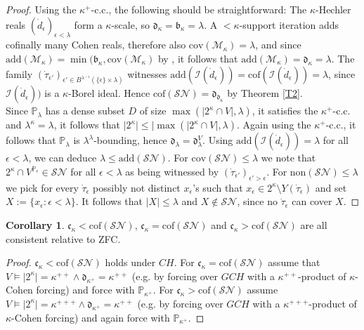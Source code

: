 \documentclass[12pt,a4paper]{scrartcl}
\theoremstyle{definition}
\newtheorem{corollary}[definition] {Corollary}
\numberwithin{equation}{section}
\begin{document}
\begin{proof}
Using the $\kappa^+$-c.c., the following should be straightforward: The $\kappa$-Hechler reals $(\dot{d}_\epsilon)_{\epsilon < \lambda}$ form a $\kappa$-scale, so $\mathfrak{d}_\kappa=\mathfrak{b}_\kappa=\lambda$. A ${<}\kappa$-support iteration adds cofinally many Cohen reals, therefore also $\text{cov}(\mathcal{M}_\kappa)=\lambda$, and since $\text{add}(\mathcal{M}_\kappa)= \min( \mathfrak{b}_\kappa, \text{cov}(\mathcal{M}_\kappa)$ by \cite{Baumhauer}, it follows that $\text{add}(\mathcal{M}_\kappa)=\mathfrak{d}_\kappa= \lambda$. The family $(\dot{\tau}_{\epsilon'})_{ \epsilon' \in B^{\lambda \, ^{-1}} (\{\epsilon\} \times \lambda)}$ witnesses $\text{add}(\mathcal{I}(\dot{d}_\epsilon))=\text{cof}(\mathcal{I}(\dot{d}_\epsilon)) =\lambda$, since $\mathcal{I}(\dot{d}_\epsilon))$ is a $\kappa$-Borel ideal. Hence $\text{cof}(\mathcal{SN})=\mathfrak{d}_{\mathfrak{d}_\kappa}$ by Theorem \ref{T2}.\\
Since $\mathbb{P}_\lambda$ has a dense subset $D$ of size $\max(\vert 2^\kappa \cap V \vert, \lambda)$, it satisfies the $\kappa^+$-c.c. and $\lambda^\kappa=\lambda$, it follows that $\vert 2^\kappa\vert \leq \vert\max(\vert 2^\kappa \cap V \vert, \lambda)$. Again using the $\kappa^+$-c.c., it follows that $\mathbb{P}_\lambda$ is $\lambda^\lambda$-bounding, hence $\mathfrak{d}_\lambda=\mathfrak{d}_\lambda^V$. Using $\text{add}(\mathcal{I}(\dot{d}_\epsilon))=\lambda$ for all $\epsilon< \lambda$, we can deduce $\lambda \leq \text{add}(\mathcal{SN})$. For $\text{cov}(\mathcal{SN}) \leq \lambda$ we note that $2^\kappa \cap V^{\mathbb{P}_\epsilon} \in \mathcal{SN}$ for all $\epsilon<\lambda$ as being witnessed by $(\dot{\tau}_{\epsilon'})_{\epsilon'> \epsilon}$. For $\text{non}(\mathcal{SN}) \leq \lambda$ we pick for every $\dot{\tau}_\epsilon$ possibly not distinct $x_\epsilon$'s such that $x_\epsilon \in 2^\kappa \setminus Y(\dot{\tau}_\epsilon)$ and set $X:=\{x_\epsilon \colon \epsilon< \lambda\}$. It follows that $\vert X \vert \leq \lambda$ and $X \notin \mathcal{SN}$, since no $\dot{\tau}_\epsilon$ can cover $X$.
\end{proof}

\begin{corollary}
$\mathfrak{c}_\kappa < \text{cof}(\mathcal{SN})$, $\mathfrak{c}_\kappa = \text{cof}(\mathcal{SN})$ and $\mathfrak{c}_\kappa > \text{cof}(\mathcal{SN})$ are all consistent relative to ZFC.
\end{corollary}

\begin{proof}
$\mathfrak{c}_\kappa < \text{cof}(\mathcal{SN})$ holds under $CH$. For $\mathfrak{c}_\kappa = \text{cof}(\mathcal{SN})$ assume that $V \vDash \vert 2^\kappa \vert = \kappa^{++} \land \mathfrak{d}_{\kappa^+}=\kappa^{++}$ (e.g. by forcing over $GCH$ with a $\kappa^{++}$-product of $\kappa$-Cohen forcing) and force with $\mathbb{P}_{\kappa^+}$. For $\mathfrak{c}_\kappa > \text{cof}(\mathcal{SN})$ assume $V \vDash \vert 2^\kappa \vert = \kappa^{+++} \land \mathfrak{d}_{\kappa^+}=\kappa^{++}$ (e.g. by forcing over $GCH$ with a $\kappa^{+++}$-product of $\kappa$-Cohen forcing) and again force with  $\mathbb{P}_{\kappa^+}$.
\end{proof}
\end{document}
